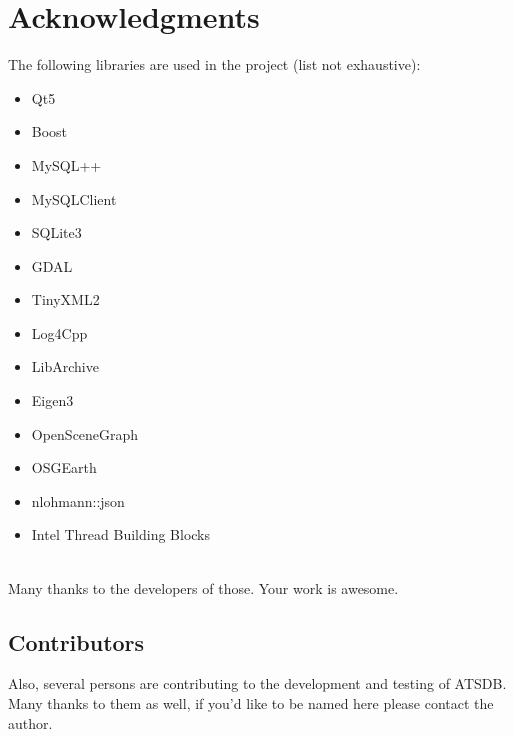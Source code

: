  \section{Acknowledgments}

The following libraries are used in the project (list not exhaustive):

\begin{itemize}  
\item Qt5
\item Boost
\item MySQL++
\item MySQLClient
\item SQLite3
\item GDAL
\item TinyXML2
\item Log4Cpp
\item LibArchive
\item Eigen3
\item OpenSceneGraph
\item OSGEarth
\item nlohmann::json
\item Intel Thread Building Blocks
\end{itemize}
\ \\

Many thanks to the developers of those. Your work is awesome.

\subsection{Contributors}

Also, several persons are contributing to the development and testing of ATSDB. Many thanks to them as well, if you'd like to be named here please contact the author.
